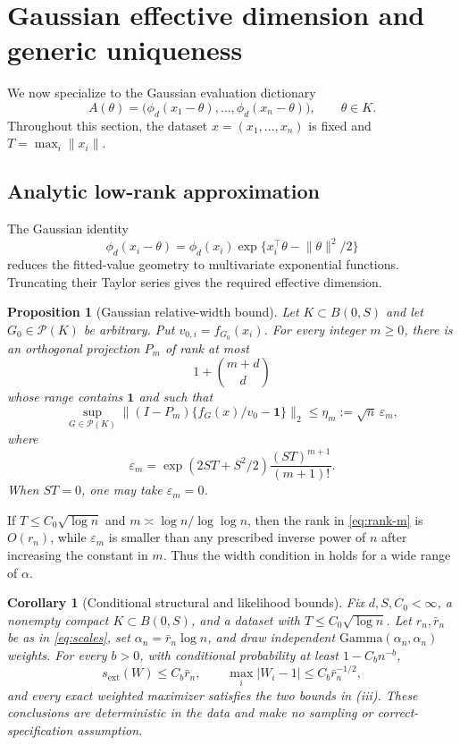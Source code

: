 \documentclass[11pt]{article}
\newtheorem{proposition}[theorem]{Proposition}
\newtheorem{corollary}[theorem]{Corollary}
\theoremstyle{definition}
\theoremstyle{remark}
\newcommand{\Pcal}{\mathcal P}
\newcommand{\one}{\bm 1}
\newcommand{\norm}[1]{\lVert #1\rVert}
\newcommand{\abs}[1]{\lvert #1\rvert}
\newcommand{\eps}{\varepsilon}
\begin{document}
\section{Gaussian effective dimension and generic uniqueness}
\label{sec:gaussian}

We now specialize  to the Gaussian evaluation dictionary
\[
 A(\theta)=\bigl(\phi_d(x_1-\theta),\ldots,
                    \phi_d(x_n-\theta)\bigr),
 \qquad \theta\in K.
\]
Throughout this section, the dataset $x=(x_1,\ldots,x_n)$ is fixed and
$T=\max_i\norm{x_i}$.

\subsection{Analytic low-rank approximation}

The Gaussian identity
\[
 \phi_d(x_i-\theta)=\phi_d(x_i)
 \exp\{x_i^\top\theta-\norm{\theta}^2/2\}
\]
reduces the fitted-value geometry to multivariate exponential functions.
Truncating their Taylor series gives the required effective dimension.

\begin{proposition}[Gaussian relative-width bound]
\label{prop:gaussian-width}
Let $K\subset B(0,S)$ and let $G_0\in\Pcal(K)$ be arbitrary.  Put
$v_{0,i}=f_{G_0}(x_i)$.  For every integer $m\ge0$, there is an orthogonal
projection $P_m$ of rank at most
\begin{equation}\label{eq:rank-m}
 1+\binom{m+d}{d}
\end{equation}
whose range contains $\one$ and such that
\begin{equation}\label{eq:eta-m}
 \sup_{G\in\Pcal(K)}
 \norm{(I-P_m)\{f_G(x)/v_0-\one\}}_2
 \le \eta_m:=\sqrt n\,\eps_m,
\end{equation}
where
\begin{equation}\label{eq:eps-m}
 \eps_m=\exp(2ST+S^2/2)\frac{(ST)^{m+1}}{(m+1)!}.
\end{equation}
When $ST=0$, one may take $\eps_m=0$.
\end{proposition}

If $T\le C_0\sqrt{\log n}$ and
$m\asymp\log n/\log\log n$, then the rank in \eqref{eq:rank-m} is
$O(r_n)$, while $\eps_m$ is smaller than any prescribed inverse power of
$n$ after increasing the constant in $m$.  Thus the width condition in
 holds for a wide range of $\alpha$.

\begin{corollary}[Conditional structural and likelihood bounds]
\label{cor:conditional}
Fix $d,S,C_0<\infty$, a nonempty compact $K\subset B(0,S)$, and a dataset
with $T\le C_0\sqrt{\log n}$.  Let $r_n,\bar r_n$ be as in
\eqref{eq:scales}, set $\alpha_n=\bar r_n\log n$, and draw independent
$\mathrm{Gamma}(\alpha_n,\alpha_n)$ weights.  For every $b>0$, with
conditional probability at least $1-C_bn^{-b}$,
\[
 s_{\mathrm{ext}}(W)\le C_b\bar r_n,
 \qquad
 \max_i\abs{W_i-1}\le C_b\bar r_n^{-1/2},
\]
and every exact weighted maximizer satisfies the two bounds in
(iii).  These conclusions are deterministic in the data and
make no sampling or correct-specification assumption.
\end{corollary}
\end{document}
